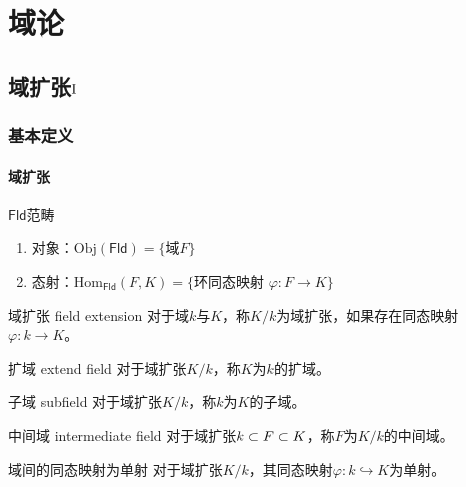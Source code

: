 % 

% 

\chapter{域论}

\section{域扩张$\rm\Rmnum{1}$}

\subsection{基本定义}

\subsubsection{域扩张}

\begin{definition}{$\textsf{Fld}$范畴}
	\begin{enumerate}
		\item 对象：$\text{Obj}(\textsf{Fld})=\{ \text{域} F \}$
		\item 态射：$\text{Hom}_{\textsf{Fld}}(F,K)=\{ \text{环同态映射 }\varphi:F\to K \}$
	\end{enumerate}
\end{definition}

\begin{definition}{域扩张 field extension}
	对于域$k$与$K$，称$K/k$为域扩张，如果存在同态映射$\varphi:k\to K$。
\end{definition}

\begin{definition}{扩域 extend field}
	对于域扩张$K/k$，称$K$为$k$的扩域。
\end{definition}

\begin{definition}{子域 subfield}
	对于域扩张$K/k$，称$k$为$K$的子域。
\end{definition}

\begin{definition}{中间域 intermediate field}
	对于域扩张$k\subset F \subset K$，称$F$为$K/k$的中间域。
\end{definition}

\begin{proposition}{}{域间的同态映射为单射}
	对于域扩张$K/k$，其同态映射$\varphi:k\hookrightarrow K$为单射。
\end{proposition}


